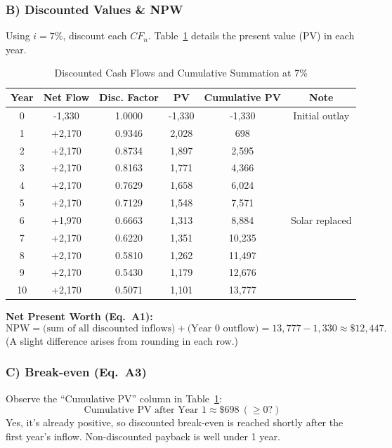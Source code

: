 \documentclass[12pt]{article}
\begin{document}
\subsubsection*{B) Discounted Values \& NPW}
Using $i=7\%$, discount each $CF_n$. Table~\ref{tab:discountedCF} details the present value (PV) in each year.

\begin{table}[h]
\centering
\caption{Discounted Cash Flows and Cumulative Summation at 7\%}
\label{tab:discountedCF}
\begin{tabular}{@{}cccccc@{}}
\toprule
\textbf{Year} & \textbf{Net Flow} & \textbf{Disc. Factor} & \textbf{PV} & \textbf{Cumulative PV} & \textbf{Note} \\
\midrule
0 & -1,330 & 1.0000 & -1,330 & -1,330 & Initial outlay \\
1 & +2,170 & 0.9346 & 2,028 & 698 & \\
2 & +2,170 & 0.8734 & 1,897 & 2,595 & \\
3 & +2,170 & 0.8163 & 1,771 & 4,366 & \\
4 & +2,170 & 0.7629 & 1,658 & 6,024 & \\
5 & +2,170 & 0.7129 & 1,548 & 7,571 & \\
6 & +1,970 & 0.6663 & 1,313 & 8,884 & Solar replaced \\
7 & +2,170 & 0.6220 & 1,351 & 10,235 & \\
8 & +2,170 & 0.5810 & 1,262 & 11,497 & \\
9 & +2,170 & 0.5430 & 1,179 & 12,676 & \\
10 & +2,170 & 0.5071 & 1,101 & 13,777 & \\
\bottomrule
\end{tabular}
\end{table}

\noindent
\textbf{Net Present Worth (Eq.~A1):}
\[
\text{NPW} 
= \text{(sum of all discounted inflows)} + \text{(Year 0 outflow)}
= 13{,}777 - 1{,}330 \approx \$12{,}447.
\]
(A slight difference arises from rounding in each row.)

\subsubsection*{C) Break-even (Eq.~A3)}
Observe the “Cumulative PV” column in Table~\ref{tab:discountedCF}:
\[
\text{Cumulative PV after Year 1} \approx \$698 \ (\ge0?)
\]
Yes, it’s already positive, so discounted break-even is reached shortly after the first year’s inflow. Non-discounted payback is well under 1 year.
\end{document}
